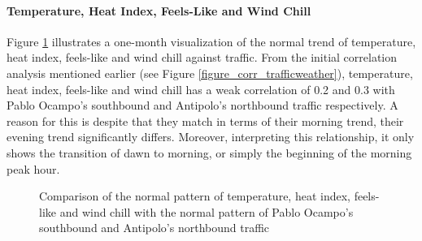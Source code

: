 \paragraph{Temperature, Heat Index, Feels-Like and Wind Chill}

Figure \ref{figure_traffic_vs_tempheatfeelswind} illustrates a one-month visualization of the normal trend of temperature, heat index, feels-like and wind chill against traffic. From the initial correlation analysis mentioned earlier (see Figure \ref{figure_corr_trafficweather}), temperature, heat index, feels-like and wind chill has a weak correlation of 0.2 and 0.3 with Pablo Ocampo’s southbound and Antipolo’s northbound traffic respectively. A reason for this is despite that they match in terms of their morning trend, their evening trend significantly differs. Moreover, interpreting this relationship, it only shows the transition of dawn to morning, or simply the beginning of the morning peak hour.


\begin{figure}[!t] 
\centering
    \centering
      \captionsetup{justification=centering}
    \hfill
    \caption{Comparison of the normal pattern of temperature, heat index, feels-like and wind chill with the normal pattern of Pablo Ocampo’s southbound and Antipolo’s northbound traffic}

    \label{figure_traffic_vs_tempheatfeelswind}
\end{figure}


